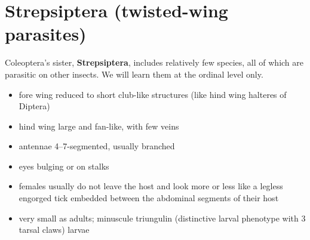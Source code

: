 \documentclass[letterpaper, 11pt]{article}
\begin{document}
\FloatBarrier
\section{Strepsiptera (twisted-wing parasites)}
Coleoptera's sister, \textbf{Strepsiptera}, includes relatively few species, all of which are parasitic on other insects. We will learn them at the ordinal level only.
\begin{itemize}
\item fore wing reduced to short club-like structures (like hind wing halteres of Diptera)
\item hind wing large and fan-like, with few veins
\item antennae 4--7-segmented, usually branched
\item eyes bulging or on stalks
\item females usually do not leave the host and look more or less like a legless engorged tick embedded between the abdominal segments of their host
\item very small as adults; minuscule triungulin (distinctive larval phenotype with 3 tarsal claws) larvae
\end{itemize}
\end{document}
